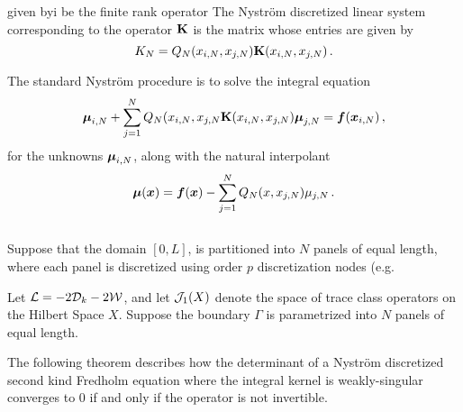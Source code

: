 

given byi
be the finite rank operator 
The Nystr\"{o}m discretized linear system corresponding to the operator
${\mathbf K}$ is the matrix whose entries are given by
\begin{equation}
K_{N} = Q_{N}(x_{i,N},x_{j,N}) {\mathbf K}(x_{i,N},x_{j,N}) \, .
\end{equation}

The standard Nystr\"{o}m procedure is to solve the integral equation
\begin{equation}
{\boldsymbol \mu}_{i,N} + \sum_{j=1}^{N} Q_N(x_{i,N},x_{j,N} {\mathbf K}(x_{i,N},x_{j,N})
{\boldsymbol \mu}_{j,N} = {\boldsymbol f}({\boldsymbol x}_{i,N}) \, ,
\end{equation}
for the unknowns ${\boldsymbol \mu}_{i,N}$, along with the natural interpolant
\begin{equation}
{\boldsymbol \mu}({\boldsymbol x}) = {\boldsymbol f}({\boldsymbol x}) - \sum_{j=1}^{N} Q_N(x,x_{j,N}) \mu_{j,N} \, .
\end{equation}

\begin{equation}
\end{equation}


Suppose that the domain $[0,L]$, is partitioned into $N$ 
panels of equal length, where each panel is discretized 
using order $p$ discretization nodes (e.g.


Let ${\mathcal L} = -2{\mathcal D}_{k} - 2{\mathcal W}$, and let ${\mathcal J}_{1}(X)$ denote the 
space of trace class operators on the Hilbert Space $X$.
Suppose the boundary $\Gamma$ is parametrized into $N$ panels
of equal length. 

\begin{definition}
\end{definition}

The following theorem describes how 
the determinant of a Nystr\"{o}m
discretized second kind Fredholm equation where the integral
kernel is weakly-singular converges to $0$ if and only if
the operator is not invertible. 

